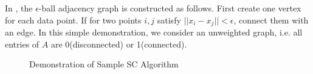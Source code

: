 In \ralg{\ref{alg:sc_sample}}, the $\epsilon$-ball adjacency graph is 
constructed as follows. First create one vertex for each data point. 
If for two points $i,j$ satisfy $||x_i-x_j|| < \epsilon$, connect 
them with an edge. In this simple demonstration, we consider an unweighted
graph, i.e. all entries of $A$ are 0(disconnected) or 1(connected). 

\begin{figure}
	\centering
	\caption{Demonstration of Sample SC Algorithm}
	\label{fig:ssc_demo}
\end{figure}

